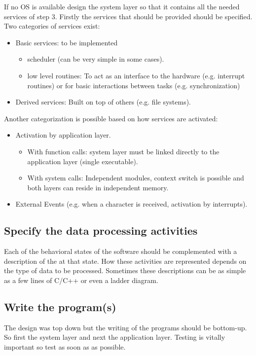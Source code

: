 If no OS is available design the  system layer so that it contains all the needed services of step 3.
Firstly the services that should be provided should be specified. 
Two categories of services exist: 
\begin{itemize}
	\item Basic services: to be implemented
	\begin{itemize}
		\item scheduler (can be very simple in some cases).
		\item low level routines: To act as an interface to the hardware (e.g. interrupt routines) or for basic interactions between tasks (e.g. synchronization)
	\end{itemize}
	
	\item Derived services: Built on top of others (e.g. file systems).
\end{itemize}

Another categorization is possible based on how services are activated: 
\begin{itemize}
	\item Activation by application layer. 
	\begin{itemize}
		\item With function calls: system layer must be linked directly to the application layer (single executable). 
		\item With system calls: Independent modules, context switch is possible and both layers can reside in independent memory.  
	\end{itemize}
	\item External Events (e.g. when a character is received, activation by interrupts). 
\end{itemize}

\subsection{Specify the data processing activities}
\label{sss:activities}
Each of the behavioral states of the software should be complemented with a description of the  at that state.
How these activities are represented depends on the type of data to be processed.
Sometimes these descriptions can be as simple as a few lines of C/C++ or even a ladder diagram.




\subsection{Write the program(s)}
\label{sss:write}
The design was top down but the writing of the programs should be bottom-up. So first the system layer and next the application layer. 
Testing is vitally important so test as soon as as possible.


